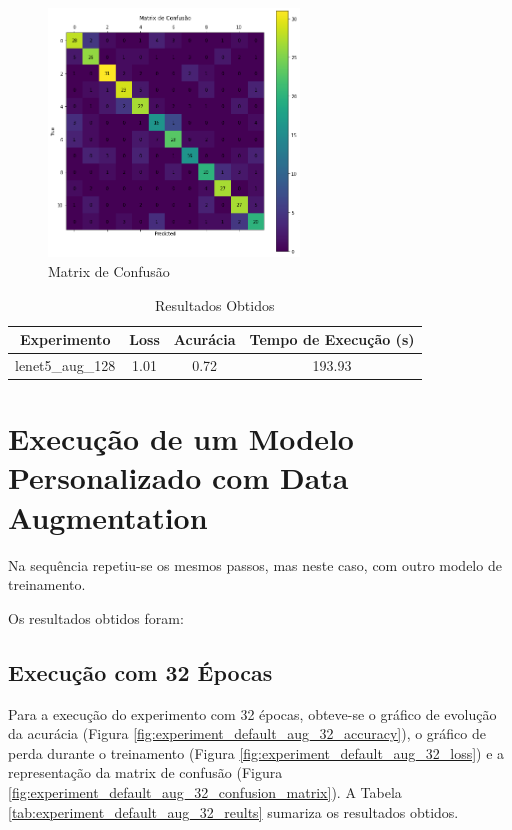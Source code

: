 \documentclass[12pt]{article}
\begin{document}
\begin{figure}[!htb]
  \centering
  \includegraphics[width=18em]{experiments/lenet5_aug_128/confusion_matrix.png}
  \caption{Matrix de Confusão}
  \label{fig:experiment_lenet5_aug_128_confusion_matrix}
\end{figure}

\begin{table}[!htb]
  \centering
  \begin{tabular}{|c|c|c|c|}
    \hline
    \textbf{Experimento} & \textbf{Loss} & \textbf{Acurácia} & \textbf{Tempo de Execução (s)} \\ \hline
    lenet5\_aug\_128     & 1.01          & 0.72              & 193.93                         \\ \hline
  \end{tabular}
  \caption{Resultados Obtidos}
  \label{tab:experiment_lenet5_aug_128_reults}
\end{table}

\section{Execução de um Modelo Personalizado com Data Augmentation}

Na sequência repetiu-se os mesmos passos, mas neste caso, com outro modelo de treinamento.

Os resultados obtidos foram:

\subsection{Execução com 32 Épocas}

Para a execução do experimento com 32 épocas, obteve-se o gráfico de evolução da acurácia (Figura \ref{fig:experiment_default_aug_32_accuracy}), o gráfico de perda durante o treinamento (Figura \ref{fig:experiment_default_aug_32_loss}) e a representação da matrix de confusão (Figura \ref{fig:experiment_default_aug_32_confusion_matrix}). A Tabela \ref{tab:experiment_default_aug_32_reults} sumariza os resultados obtidos.
\end{document}
